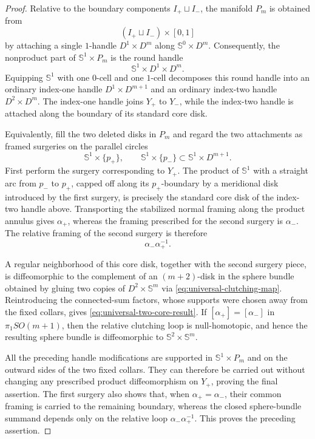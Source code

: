 \documentclass[11pt,reqno]{amsart}
\theoremstyle{definition}
\numberwithin{equation}{section}
\begin{document}
\begin{proof}
Relative to the boundary components \(I_+\sqcup I_-\), the manifold
\(P_m\) is obtained from
\[
 (I_+\sqcup I_-)\times[0,1]
\]
by attaching a single \(1\)-handle \(D^1\times D^m\) along
\(\mathbb S^0\times D^m\).  Consequently, the nonproduct part of
\(\mathbb S^1\times P_m\) is the round handle
\[
 \mathbb S^1\times D^1\times D^m.
\]
Equipping \(\mathbb S^1\) with one \(0\)-cell and one \(1\)-cell
decomposes this round handle into an ordinary index-one handle
\(D^1\times D^{m+1}\) and an ordinary index-two handle
\(D^2\times D^m\).  The index-one handle joins \(Y_+\) to \(Y_-\),
while the index-two handle is attached along the boundary of its
standard core disk.

Equivalently, fill the two deleted disks in \(P_m\) and regard the two
attachments as framed surgeries on the parallel circles
\[
 \mathbb S^1\times\{p_+\},
 \qquad
 \mathbb S^1\times\{p_-\}
 \subset \mathbb S^1\times D^{m+1}.
\]
First perform the surgery corresponding to \(Y_+\).  The product of
\(\mathbb S^1\) with a straight arc from \(p_-\) to \(p_+\), capped
off along its \(p_+\)-boundary by a meridional disk introduced by the
first surgery, is precisely the standard core disk of the index-two
handle above.  Transporting the stabilized normal framing along the
product annulus gives \(\alpha_+\), whereas the framing prescribed for
the second surgery is \(\alpha_-\).  The relative framing of the second
surgery is therefore
\[
 \alpha_-\alpha_+^{-1}.
\]

A regular neighborhood of this core disk, together with the second
surgery piece, is diffeomorphic to the complement of an
\((m+2)\)-disk in the sphere bundle obtained by gluing two copies of
\(D^2\times\mathbb S^m\) via
\eqref{eq:universal-clutching-map}.  Reintroducing the connected-sum
factors, whose supports were chosen away from the fixed collars, gives
\eqref{eq:universal-two-core-result}.  If
\([\alpha_+]=[\alpha_-]\) in \(\pi_1SO(m+1)\), then the relative
clutching loop is null-homotopic, and hence the resulting sphere bundle
is diffeomorphic to \(\mathbb S^2\times\mathbb S^m\).

All the preceding handle modifications are supported in
\(\mathbb S^1\times P_m\) and on the outward sides of the two fixed
collars.  They can therefore be carried out without changing any
prescribed product diffeomorphism on \(Y_+\), proving the final
assertion.  The first surgery also shows that, when
\(\alpha_+=\alpha_-\), their common framing is carried to the
remaining boundary, whereas the closed sphere-bundle summand depends
only on the relative loop \(\alpha_-\alpha_+^{-1}\).  This proves the
preceding assertion.
\end{proof}
\end{document}
